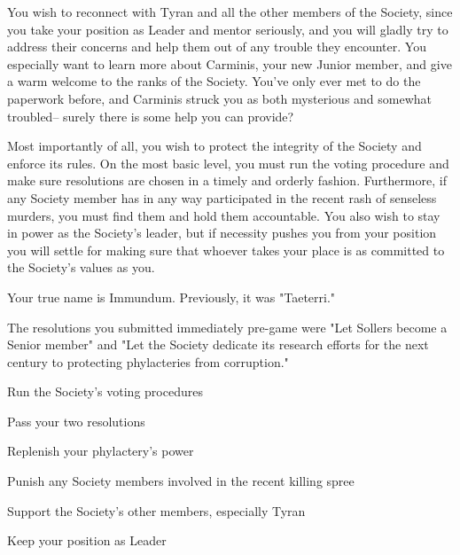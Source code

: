\documentclass[char]{Sel}
\begin{document}
You wish to reconnect with Tyran and all the other members of the Society, since you take your position as Leader and mentor seriously, and you will gladly try to address their concerns and help them out of any trouble they encounter. You especially want to learn more about Carminis, your new Junior member, and give a warm welcome to the ranks of the Society. You’ve only ever met to do the paperwork before, and Carminis struck you as both mysterious and somewhat troubled-- surely there is some help you can provide?

Most importantly of all, you wish to protect the integrity of the Society and enforce its rules. On the most basic level, you must run the voting procedure and make sure resolutions are chosen in a timely and orderly fashion. Furthermore, if any Society member has in any way participated in the recent rash of senseless murders, you must find them and hold them accountable. You also wish to stay in power as the Society's leader, but if necessity pushes you from your position you will settle for making sure that whoever takes your place is as committed to the Society's values as you.
\begin{itemz}[Notes]
  \item Your true name is Immundum. Previously, it was "Taeterri."
  \item The resolutions you submitted immediately pre-game were "Let Sollers become a Senior member" and "Let the Society dedicate its research efforts for the next century to protecting phylacteries from corruption."
    \end{itemz}
    
     \begin{itemz}[Goals]
     \item Run the Society's voting procedures
 \item Pass your two resolutions
 \item Replenish your phylactery's power
\item Punish any Society members involved in the recent killing spree
\item Support the Society's other members, especially Tyran
\item Keep your position as Leader
\end{itemz}
\end{document}
